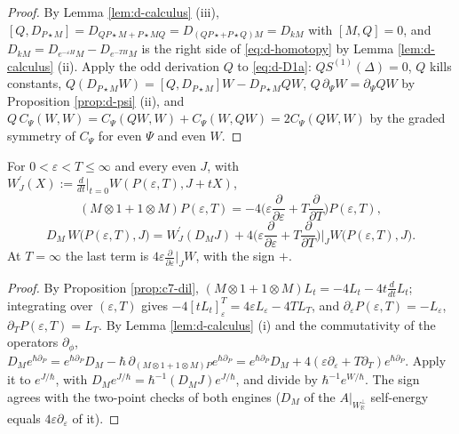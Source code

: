 \begin{proof}
By Lemma \ref{lem:d-calculus} (iii), $[Q,D_{P\star M}]=D_{QP\star M+P\star MQ}=D_{(QP\star+P\star Q)M}=D_{kM}$ with $[M,Q]=0$, and $D_{kM}=D_{e^{-\varepsilon H}M}-D_{e^{-TH}M}$ is the right side of \eqref{eq:d-homotopy} by Lemma \ref{lem:d-calculus} (ii). Apply the odd derivation $Q$ to \eqref{eq:d-D1a}: $QS^{(1)}(\Delta)=0$, $Q$ kills constants, $Q(D_{P\star M}W)=[Q,D_{P\star M}]W-D_{P\star M}QW$, $Q\,\partial_\Psi W=\partial_\Psi QW$ by Proposition \ref{prop:d-psi} (ii), and $Q\,C_\Psi(W,W)=C_\Psi(QW,W)+C_\Psi(W,QW)=2C_\Psi(QW,W)$ by the graded symmetry of $C_\Psi$ for even $\Psi$ and even $W$.
\end{proof}

\begin{proposition}
\label{prop:d-ward}
For $0<\varepsilon<T\le\infty$ and every even $J$, with $W^{\prime}_J(X):=\frac{d}{dt}\big|_{t=0}W(P(\varepsilon,T),J+tX)$,
\begin{equation}
(M\otimes1+1\otimes M)P(\varepsilon,T)=-4\Big(\varepsilon\frac{\partial}{\partial\varepsilon}+T\frac{\partial}{\partial T}\Big)P(\varepsilon,T),
\label{eq:d-MP}
\end{equation}
\begin{equation}
D_M\,W\big(P(\varepsilon,T),J\big)=W^{\prime}_J(D_MJ)+4\Big(\varepsilon\frac{\partial}{\partial\varepsilon}+T\frac{\partial}{\partial T}\Big)\Big|_JW\big(P(\varepsilon,T),J\big).
\label{eq:d-ward}
\end{equation}
At $T=\infty$ the last term is $4\varepsilon\frac{\partial}{\partial\varepsilon}|_JW$, with the sign $+$.
\end{proposition}

\begin{proof}
By Proposition \ref{prop:c7-dil}, $(M\otimes1+1\otimes M)L_t=-4L_t-4t\frac{d}{dt}L_t$; integrating over $(\varepsilon,T)$ gives $-4[tL_t]_\varepsilon^T=4\varepsilon L_\varepsilon-4TL_T$, and $\partial_\varepsilon P(\varepsilon,T)=-L_\varepsilon$, $\partial_TP(\varepsilon,T)=L_T$. By Lemma \ref{lem:d-calculus} (i) and the commutativity of the operators $\partial_\phi$, $D_Me^{\hbar\partial_P}=e^{\hbar\partial_P}D_M-\hbar\,\partial_{(M\otimes1+1\otimes M)P}e^{\hbar\partial_P}=e^{\hbar\partial_P}D_M+4(\varepsilon\partial_\varepsilon+T\partial_T)e^{\hbar\partial_P}$. Apply it to $e^{J/\hbar}$, with $D_Me^{J/\hbar}=\hbar^{-1}(D_MJ)e^{J/\hbar}$, and divide by $\hbar^{-1}e^{W/\hbar}$. The sign agrees with the two-point checks of both engines ($D_M$ of the $A|_{W_{\mathbb R}^\perp}$ self-energy equals $4\varepsilon\partial_\varepsilon$ of it).
\end{proof}


